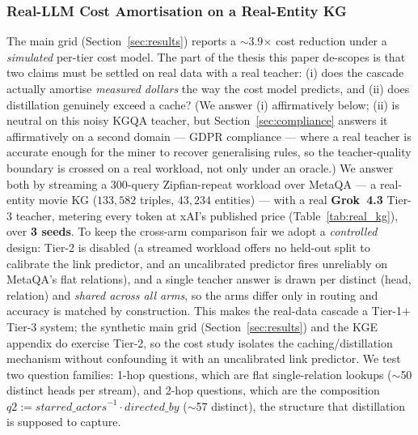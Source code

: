 \documentclass[11pt]{article}
\theoremstyle{plain}
\newcommand{\costFactor}{3.9}
\renewcommand{\costFactor}{3.9}
\begin{document}
\subsubsection{Real-LLM Cost Amortisation on a Real-Entity KG}
\label{sec:realcost}
The main grid (Section~\ref{sec:results}) reports a $\sim$\costFactor$\times$
cost reduction under a \emph{simulated} per-tier cost model. The part of the
thesis this paper de-scopes is that two claims must be settled on real data with a
real teacher: (i) does the cascade actually amortise \emph{measured dollars}
the way the cost model predicts, and (ii) does distillation genuinely exceed a
cache? (We answer (i) affirmatively below; (ii) is neutral on this noisy KGQA teacher,
but Section~\ref{sec:compliance} answers it affirmatively on a second domain ---
GDPR compliance --- where a real teacher is accurate enough for the miner to
recover generalising rules, so the teacher-quality boundary is crossed on a real
workload, not only under an oracle.) We answer both by streaming a $300$-query Zipfian-repeat
workload over MetaQA --- a real-entity movie KG ($133{,}582$ triples,
$43{,}234$ entities) --- with a real \textbf{Grok~4.3} Tier-3 teacher, metering
every token at xAI's published price (Table~\ref{tab:real_kg}), over
\textbf{3 seeds}. To keep the cross-arm comparison fair we adopt a
\emph{controlled} design: Tier-2 is disabled (a streamed workload offers no
held-out split to calibrate the link predictor, and an uncalibrated predictor
fires unreliably on MetaQA's flat relations), and a single teacher answer is
drawn per distinct (head,\,relation) and \emph{shared across all arms}, so the
arms differ only in routing and accuracy is matched by construction. This makes
the real-data cascade a Tier-1$+$Tier-3 system; the synthetic main grid
(Section~\ref{sec:results}) and the KGE appendix do exercise Tier-2, so the cost
study isolates the caching/distillation mechanism without confounding it with an
uncalibrated link predictor. We test two
question families: 1-hop questions, which are flat single-relation lookups
($\sim$50 distinct heads per stream), and 2-hop questions, which are the
composition $q2 := \mathit{starred\_actors}^{-1}\cdot\mathit{directed\_by}$
($\sim$57 distinct), the structure that distillation is supposed to capture.
\end{document}
